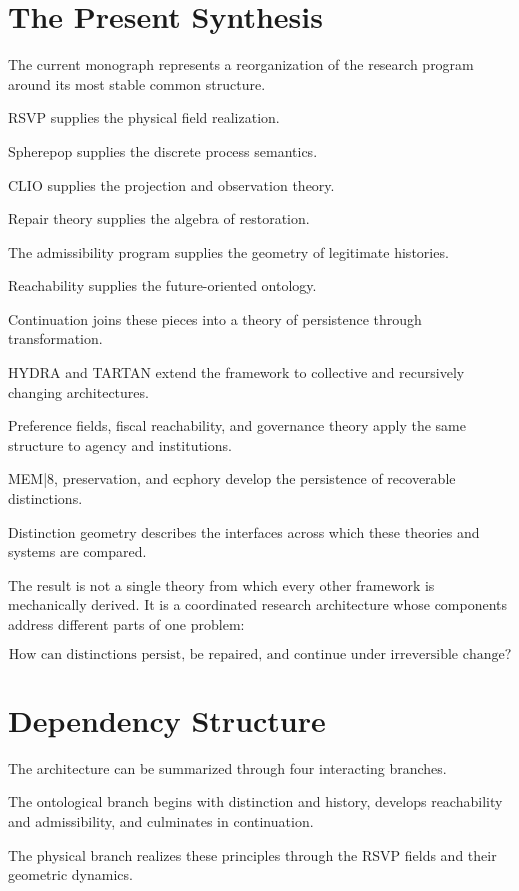 \documentclass[11pt,oneside]{book}
\numberwithin{equation}{chapter}
\theoremstyle{definition}
\theoremstyle{plain}
\begin{document}
\section{The Present Synthesis}

The current monograph represents a reorganization of the research program
around its most stable common structure.

RSVP supplies the physical field realization.

Spherepop supplies the discrete process semantics.

CLIO supplies the projection and observation theory.

Repair theory supplies the algebra of restoration.

The admissibility program supplies the geometry of legitimate histories.

Reachability supplies the future-oriented ontology.

Continuation joins these pieces into a theory of persistence through
transformation.

HYDRA and TARTAN extend the framework to collective and recursively
changing architectures.

Preference fields, fiscal reachability, and governance theory apply the
same structure to agency and institutions.

MEM|8, preservation, and ecphory develop the persistence of recoverable
distinctions.

Distinction geometry describes the interfaces across which these theories
and systems are compared.

The result is not a single theory from which every other framework is
mechanically derived. It is a coordinated research architecture whose
components address different parts of one problem:

\[
\boxed{
\text{How can distinctions persist, be repaired, and continue under
irreversible change?}
}
\]

\section{Dependency Structure}

The architecture can be summarized through four interacting branches.

The ontological branch begins with distinction and history, develops
reachability and admissibility, and culminates in continuation.

The physical branch realizes these principles through the RSVP fields and
their geometric dynamics.
\end{document}

